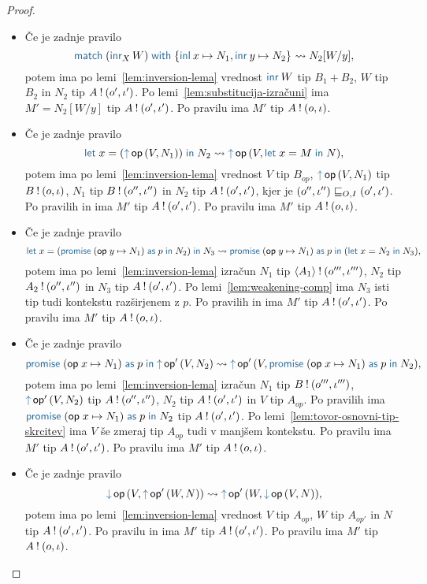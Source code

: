 \begin{proof}
\begin{itemize}
		\item Če je zadnje pravilo $$\tmmatch{(\tminr[X]{W})}{\tminl{x} \mapsto N_1, \tminr{y} \mapsto N_2} \reduces N_2[W/y],$$ potem ima po lemi~\ref{lem:inversion-lema} vrednost $\tminr{W}$ tip $B_1 + B_2$, $W$ tip $B_2$ in $N_2$ tip $A \mathbin{!} (o', \iota')$.
		Po lemi~\ref{lem:substitucija-izračuni} ima $M' = N_2[W/y]$ tip $A \mathbin{!} (o', \iota')$.
		Po pravilu  ima $M'$ tip $A \mathbin{!} (o, \iota)$.
		
		\item Če je zadnje pravilo $$\tmlet{x}{(\tmopout{op}{V}{N_1})}{N_2} \reduces \tmopout{op}{V}{\tmlet{x}{M}{N}},$$ potem ima po lemi~\ref{lem:inversion-lema} vrednost $V$ tip $B_{op}$, $\tmopout{op}{V}{N_1}$ tip $B \mathbin{!} (o, \iota)$, $N_1$ tip $B \mathbin{!} (o'', \iota'')$ in $N_2$ tip $A \mathbin{!} (o', \iota')$, kjer je $(o'', \iota'') \sqsubseteq_{O, I} (o', \iota')$.
		Po pravilih  in  ima $M'$ tip $A \mathbin{!} (o', \iota')$.
		Po pravilu  ima $M'$ tip $A \mathbin{!} (o, \iota)$.
		
		\item Če je zadnje pravilo $$\tmlet{x}{(\tmwith{op}{y}{N_1}{p}{N_2})}{N_3} \reduces \tmwith{op}{y}{N_1}{p}{(\tmlet{x}{N_2}{N_3})},$$ potem ima po lemi~\ref{lem:inversion-lema} izračun $N_1$ tip $\langle A_1 \rangle \mathbin{!} (o''', \iota''')$, $N_2$ tip $A_2 \mathbin{!} (o'', \iota'')$ in $N_3$ tip $A \mathbin{!} (o', \iota')$.
		Po lemi~\ref{lem:weakening-comp} ima $N_3$ isti tip tudi kontekstu razširjenem z $p$.
		Po pravilih  in  ima $M'$ tip $A \mathbin{!} (o', \iota')$.
		Po pravilu  ima $M'$ tip $A \mathbin{!} (o, \iota)$.
		
		\item Če je zadnje pravilo $$\tmwith{op}{x}{N_1}{p}{\tmopout{op'}{V}{N_2}} \reduces \tmopout{op'}{V}{\tmwith{op}{x}{N_1}{p}{N_2}},$$ potem ima po lemi~\ref{lem:inversion-lema} izračun $N_1$ tip $B \mathbin{!} (o''', \iota''')$, $\tmopout{op'}{V}{N_2}$ tip $A \mathbin{!} (o'', \iota'')$, $N_2$ tip $A \mathbin{!} (o', \iota')$ in $V$ tip $A_{op}$.
		Po pravilih  ima $\tmwith{op}{x}{N_1}{p}{N_2}$ tip $A \mathbin{!} (o', \iota')$.
		Po lemi~\ref{lem:tovor-osnovni-tip-skrcitev} ima $V$ še zmeraj tip $A_{op}$ tudi v manjšem kontekstu. Po pravilu  ima $M'$ tip $A \mathbin{!} (o', \iota')$.
		Po pravilu  ima $M'$ tip $A \mathbin{!} (o, \iota)$.
		
		\item Če je zadnje pravilo $$\tmopin{op}{V}{\tmopout{op'}{W}{N}} \reduces \tmopout{op'}{W}{\tmopin{op}{V}{N}},$$ potem ima po lemi~\ref{lem:inversion-lema} vrednost $V$ tip $A_{op}$, $W$ tip $A_{op'}$ in $N$ tip $A \mathbin{!} (o', \iota')$.
		Po pravilu  in  ima $M'$ tip $A \mathbin{!} (o', \iota')$.
		Po pravilu  ima $M'$ tip $A \mathbin{!} (o, \iota)$.
		

\end{itemize}
\end{proof}
